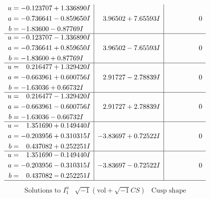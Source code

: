 \documentclass[1p]{elsarticle_modified}
\theoremstyle{definition}
\newcommand{\I}{\sqrt{-1}}
\begin{document}
$$\begin{array}{c|c|c}
\begin{aligned}
u &= -0.123707 + 1.336890 I \\
a &= -0.736641 - 0.859650 I \\
b &= -1.83600 - 0.87769 I\end{aligned}
 & \phantom{-}3.96502 + 7.65593 I & \phantom{-0.000000 } 0 \\ \hline\begin{aligned}
u &= -0.123707 - 1.336890 I \\
a &= -0.736641 + 0.859650 I \\
b &= -1.83600 + 0.87769 I\end{aligned}
 & \phantom{-}3.96502 - 7.65593 I & \phantom{-0.000000 } 0 \\ \hline\begin{aligned}
u &= \phantom{-}0.216477 + 1.329420 I \\
a &= -0.663961 + 0.600756 I \\
b &= -1.63036 + 0.66732 I\end{aligned}
 & \phantom{-}2.91727 - 2.78839 I & \phantom{-0.000000 } 0 \\ \hline\begin{aligned}
u &= \phantom{-}0.216477 - 1.329420 I \\
a &= -0.663961 - 0.600756 I \\
b &= -1.63036 - 0.66732 I\end{aligned}
 & \phantom{-}2.91727 + 2.78839 I & \phantom{-0.000000 } 0 \\ \hline\begin{aligned}
u &= \phantom{-}1.351690 + 0.149440 I \\
a &= -0.203956 + 0.310315 I \\
b &= \phantom{-}0.437082 + 0.252251 I\end{aligned}
 & -3.83697 + 0.72522 I & \phantom{-0.000000 } 0 \\ \hline\begin{aligned}
u &= \phantom{-}1.351690 - 0.149440 I \\
a &= -0.203956 - 0.310315 I \\
b &= \phantom{-}0.437082 - 0.252251 I\end{aligned}
 & -3.83697 - 0.72522 I & \phantom{-0.000000 } 0\\
 \hline 
 \end{array}$$\newpage$$\begin{array}{c|c|c}  
\text{Solutions to }I^u_{1}& \I (\text{vol} + \sqrt{-1}CS) & \text{Cusp shape}\\
 \hline 
\begin{aligned}

\end{aligned}
\end{array}$$
\end{document}
